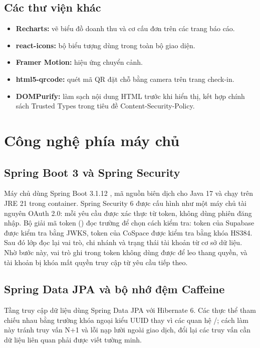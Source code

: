 \subsection{Các thư viện khác}
\begin{itemize}
    \item \textbf{Recharts:} vẽ biểu đồ doanh thu và cơ cấu đơn trên các trang báo cáo.
    \item \textbf{react-icons:} bộ biểu tượng dùng trong toàn bộ giao diện.
    \item \textbf{Framer Motion:} hiệu ứng chuyển cảnh.
    \item \textbf{html5-qrcode:} quét mã QR đặt chỗ bằng camera trên trang check-in.
    \item \textbf{DOMPurify:} làm sạch nội dung HTML trước khi hiển thị, kết hợp chính sách Trusted Types trong tiêu đề Content-Security-Policy.
\end{itemize}

\section{Công nghệ phía máy chủ}
\label{sec:cn_backend}

\subsection{Spring Boot 3 và Spring Security}
Máy chủ dùng Spring Boot 3.1.12 \cite{spring_boot_docs}, mã nguồn biên dịch cho Java 17 và chạy trên JRE 21 trong container. Spring Security 6 được cấu hình như một máy chủ tài nguyên OAuth 2.0: mỗi yêu cầu được xác thực từ token, không dùng phiên đăng nhập. Bộ giải mã token () đọc trường  để chọn cách kiểm tra: token của Supabase được kiểm tra bằng JWKS, token của CoSpace được kiểm tra bằng khóa HS384. Sau đó lớp  đọc lại vai trò, chi nhánh và trạng thái tài khoản từ cơ sở dữ liệu. Nhờ bước này, vai trò ghi trong token không dùng được để leo thang quyền, và tài khoản bị khóa mất quyền truy cập từ yêu cầu tiếp theo.

\subsection{Spring Data JPA và bộ nhớ đệm Caffeine}
Tầng truy cập dữ liệu dùng Spring Data JPA với Hibernate 6. Các thực thể tham chiếu nhau bằng trường khóa ngoại kiểu UUID thay vì các quan hệ /; cách làm này tránh truy vấn N+1 và lỗi nạp lười ngoài giao dịch, đổi lại các truy vấn cần dữ liệu liên quan phải được viết tường minh.

